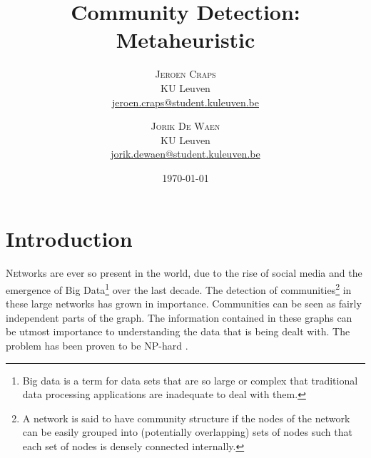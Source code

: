 \documentclass[twoside,twocolumn]{article}
\title{Community Detection: Metaheuristic} %
\author{%
\textsc{Jeroen Craps} \\[1ex] %
\normalsize KU Leuven \\ %
\normalsize \href{mailto:jeroen.craps@student.kuleuven.be}{jeroen.craps@student.kuleuven.be} %
\and %
\textsc{Jorik De Waen} \\[1ex] %
\normalsize KU Leuven \\ %
\normalsize \href{mailto:jorik.dewaen@student.kuleuven.be}{jorik.dewaen@student.kuleuven.be} %
}
\date{\today} %
\begin{document}
\maketitle


\section{Introduction}

\lettrine[nindent=0em,lines=3]{N} etworks are ever so present in the world, due to the rise of social media and the emergence of Big Data\footnote{Big data is a term for data sets that are so large or complex that traditional data processing applications are inadequate to deal with them.} over the last decade.
The detection of communities\footnote{A network is said to have community structure if the nodes of the network can be easily grouped into (potentially overlapping) sets of nodes such that each set of nodes is densely connected internally.} in these large networks has grown in importance.
Communities can be seen as fairly independent parts of the graph.
The information contained in these graphs can be utmost importance to understanding the data that is being dealt with.
The problem has been proven to be NP-hard \cite{Fortunato2010}.

\end{document}
